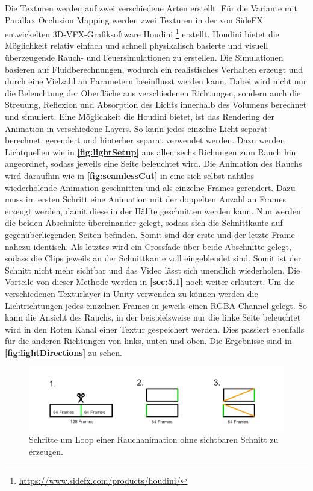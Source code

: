 Die Texturen werden auf zwei verschiedene Arten erstellt. Für die Variante mit Parallax Occlusion Mapping werden zwei
Texturen in der von SideFX entwickelten 3D-VFX-Grafiksoftware Houdini \footnote{\url{https://www.sidefx.com/products/houdini/}} erstellt.
Houdini bietet die Möglichkeit relativ einfach und schnell physikalisch basierte und visuell überzeugende Rauch- und Feuersimulationen zu erstellen.
Die Simulationen basieren auf Fluidberechnungen, wodurch ein realistisches Verhalten erzeugt und durch eine Vielzahl an Parametern beeinflusst werden kann.
Dabei wird nicht nur die Beleuchtung der Oberfläche aus verschiedenen Richtungen, sondern auch die Streuung, Reflexion und Absorption des Lichts innerhalb
des Volumens berechnet und simuliert.
Eine Möglichkeit die Houdini bietet, ist das Rendering der Animation in verschiedene Layers. So kann jedes einzelne Licht separat berechnet, gerendert und
hinterher separat verwendet werden. Dazu werden Lichtquellen wie in \textbf{\autoref{fig:lightSetup}} aus allen sechs Richungen zum Rauch hin angeordnet,
sodass jeweils eine Seite beleuchtet wird.
Die Animation des Rauchs wird daraufhin wie in \textbf{\autoref{fig:seamlessCut}} in eine sich selbst nahtlos wiederholende Animation
geschnitten und als einzelne Frames gerendert. Dazu muss im ersten Schritt eine Animation mit der doppelten Anzahl an Frames erzeugt werden, damit diese in der Hälfte
geschnitten werden kann. Nun werden die beiden Abschnitte übereinander gelegt, sodass sich die Schnittkante auf gegenüberliegenden Seiten befinden. Somit sind der erste
und der letzte Frame nahezu identisch. Als letztes wird ein Crossfade über beide Abschnitte gelegt, sodass die Clips jeweils an der Schnittkante voll eingeblendet
sind. Somit ist der Schnitt nicht mehr sichtbar und das Video lässt sich unendlich wiederholen. Die Vorteile von dieser Methode werden in \textbf{\autoref{sec:5.1}}
noch weiter erläutert.
Um die verschiedenen Texturlayer in Unity verwenden zu können werden die Lichtrichtungen jedes einzelnen Frames in jeweils einen RGBA-Channel gelegt.
So kann die Ansicht des Rauchs, in der beispielsweise nur die linke Seite beleuchtet wird in den Roten Kanal einer Textur gespeichert werden.
Dies passiert ebenfalls für die anderen Richtungen von links, unten und oben. Die Ergebnisse sind in \textbf{\autoref{fig:lightDirections}} zu sehen.



\begin{figure}[h!]
	\includegraphics[width=\textwidth]{Grafiken/Implementation/Lightmaps/SeamlessCut.png}
	\centering
	\begin{footnotesize}
		\caption{Schritte um Loop einer Rauchanimation ohne sichtbaren Schnitt zu erzeugen. }
		\label{fig:seamlessCut}
	\end{footnotesize}
\end{figure}

